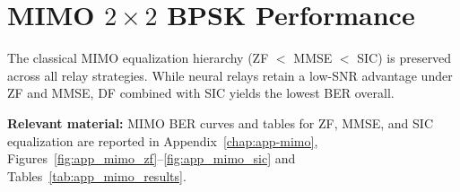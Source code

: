 \section{MIMO $2\times2$ BPSK Performance}
\label{sec:mimo-bpsk}

The classical MIMO equalization hierarchy (ZF $<$ MMSE $<$ SIC) is preserved across all relay strategies.
While neural relays retain a low-SNR advantage under ZF and MMSE, DF combined with SIC yields the lowest BER overall.

\textbf{Relevant material:}
MIMO BER curves and tables for ZF, MMSE, and SIC equalization are reported in
Appendix~\ref{chap:app-mimo},
Figures~\ref{fig:app_mimo_zf}--\ref{fig:app_mimo_sic}
and Tables~\ref{tab:app_mimo_results}.